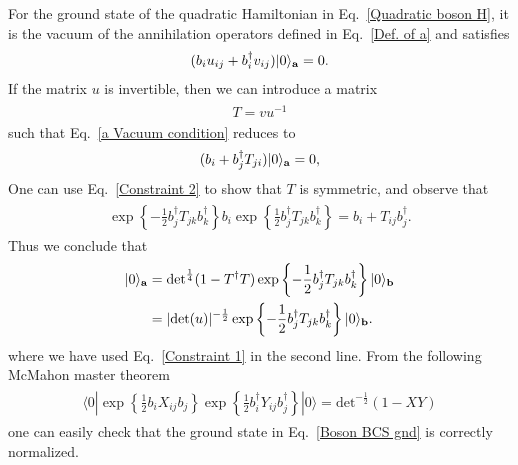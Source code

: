 For the ground state of the quadratic Hamiltonian in Eq.~\eqref{Quadratic boson H}, it is the vacuum of the annihilation operators defined in Eq.~\eqref{Def. of a} and satisfies
\begin{eqnarray}\begin{aligned}
\label{a Vacuum condition}
(b_iu_{ij}+b_i^\dagger v_{ij})|0\rangle_{{\bf a}}=0.
\end{aligned}\end{eqnarray}
If the matrix $u$ is invertible, then we can introduce a matrix
\begin{eqnarray}\begin{aligned}
T=vu^{-1}
\end{aligned}\end{eqnarray}
such that Eq.~\eqref{a Vacuum condition} reduces to
\begin{eqnarray}\begin{aligned}
(b_i+b_j^\dagger T_{ji})|0\rangle_{{\bf a}}=0,
\end{aligned}\end{eqnarray}
One can use Eq.~\eqref{Constraint 2} to show that $T$ is symmetric, and observe that
\begin{eqnarray}\begin{aligned}
\exp\left\{-\frac{1}{2}b_j^\dagger T_{jk}b_k^\dagger\right\}b_i\exp\left\{\frac{1}{2}b_j^\dagger T_{jk}b_k^\dagger\right\}=b_i+T_{ij}b^\dagger_j.
\end{aligned}\end{eqnarray}
Thus we conclude that 
\begin{eqnarray}\begin{aligned}
\label{Boson BCS gnd}
|0\rangle_{{\bf a}}&=\text{det}^{\frac{1}{4}}(1-T^\dagger T)\exp\left\{-\frac{1}{2}b_j^\dagger T_{jk}b_k^\dagger\right\}|0\rangle_{\bf b}\\
&=|\text{det}(u)|^{-\frac{1}{2}}\exp\left\{-\frac{1}{2}b_j^\dagger T_{jk}b_k^\dagger\right\}|0\rangle_{\bf b}.
\end{aligned}\end{eqnarray}
where we have used Eq.~\eqref{Constraint 1} in the second line. From the following McMahon master theorem
\begin{eqnarray}\begin{aligned}\label{Bosonic McMahon}
\langle0|\exp\left\{\frac{1}{2}b_iX_{ij}b_j\right\}\exp\left\{\frac{1}{2}b^\dagger_iY_{ij}b^\dagger_j\right\}|0\rangle=\text{det}^{-\frac{1}{2}}(1-XY)
\end{aligned}\end{eqnarray}
one can easily check that the ground state in Eq.~\eqref{Boson BCS gnd} is correctly normalized. 

